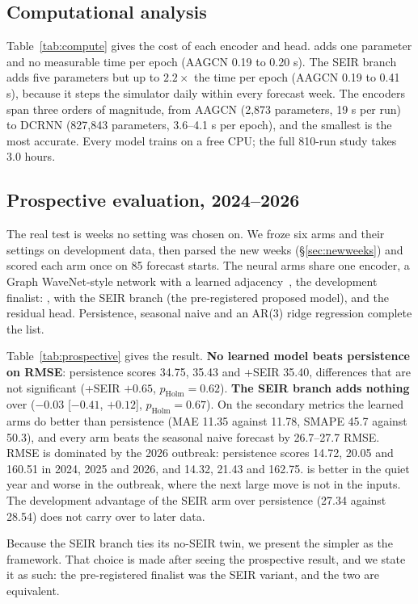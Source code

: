 \subsection{Computational analysis}
\label{sec:compute}
Table~\ref{tab:compute} gives the cost of each encoder and head. \model{} adds one
parameter and no measurable time per epoch (AAGCN 0.19 to 0.20 s). The SEIR branch adds
five parameters but up to $2.2\times$ the time per epoch (AAGCN 0.19 to 0.41 s), because it steps the simulator daily within every forecast week. The
encoders span three orders of magnitude, from AAGCN (2{,}873 parameters, 19 s per run)
to DCRNN (827{,}843 parameters, 3.6--4.1 s per epoch), and the smallest is the most
accurate. Every model trains on a free CPU; the full 810-run study takes 3.0 hours.

\subsection{Prospective evaluation, 2024--2026}
\label{sec:prospective}
The real test is weeks no setting was chosen on. We froze six arms and their settings
on development data, then parsed the new weeks (\S\ref{sec:newweeks}) and scored each
arm once on 85 forecast starts. The neural arms share one encoder, a Graph
WaveNet-style network with a learned adjacency~\cite{wu2019graphwavenet}, the
development finalist: \model{}, \model{} with the SEIR branch (the pre-registered
proposed model), and the residual head. Persistence, seasonal naive and an AR(3)
ridge regression complete the list.

Table~\ref{tab:prospective} gives the result. \textbf{No learned model beats
persistence on RMSE}: persistence scores 34.75, \model{} 35.43 and \model{}+SEIR 35.40,
differences that are not significant (\model{}+SEIR $+0.65$, $p_{\text{Holm}}=0.62$).
\textbf{The SEIR branch adds nothing} over \model{} ($-0.03$ [$-0.41$, $+0.12$],
$p_{\text{Holm}}=0.67$). On the secondary metrics the learned arms do better than
persistence (MAE 11.35 against 11.78, SMAPE 45.7 against 50.3), and every arm beats the
seasonal naive forecast by 26.7--27.7 RMSE. RMSE is dominated by the 2026 outbreak:
persistence scores 14.72, 20.05 and 160.51 in 2024, 2025 and 2026, and \model{} 14.32,
21.43 and 162.75. \model{} is better in the quiet year and worse in the outbreak, where
the next large move is not in the inputs. The development advantage of the SEIR arm over
persistence (27.34 against 28.54) does not carry over to later data.

Because the SEIR branch ties its no-SEIR twin, we present the simpler \model{} as the
framework. That choice is made after seeing the prospective result, and we state it as
such: the pre-registered finalist was the SEIR variant, and the two are equivalent.

